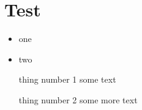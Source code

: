 \documentclass[10pt]{article}
\begin{document}
\section{Test}
\begin{itemize}
 \item one
 \item two
\end{itemize}

\begin{itemize}
 \item[thing number 1] some text
 \item[thing number 2] some more text
\end{itemize}
\end{document}
